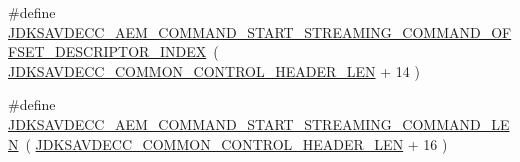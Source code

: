 \begin{DoxyCompactItemize}
\#define \hyperlink{group__command__start__streaming_ga9a6fbc00ff574d3d0a5d55567909aaf0}{J\+D\+K\+S\+A\+V\+D\+E\+C\+C\+\_\+\+A\+E\+M\+\_\+\+C\+O\+M\+M\+A\+N\+D\+\_\+\+S\+T\+A\+R\+T\+\_\+\+S\+T\+R\+E\+A\+M\+I\+N\+G\+\_\+\+C\+O\+M\+M\+A\+N\+D\+\_\+\+O\+F\+F\+S\+E\+T\+\_\+\+D\+E\+S\+C\+R\+I\+P\+T\+O\+R\+\_\+\+I\+N\+D\+EX}~( \hyperlink{group__jdksavdecc__avtp__common__control__header_gaae84052886fb1bb42f3bc5f85b741dff}{J\+D\+K\+S\+A\+V\+D\+E\+C\+C\+\_\+\+C\+O\+M\+M\+O\+N\+\_\+\+C\+O\+N\+T\+R\+O\+L\+\_\+\+H\+E\+A\+D\+E\+R\+\_\+\+L\+EN} + 14 )
\item 
\#define \hyperlink{group__command__start__streaming_ga64b3f37bb8a2701b0fa5255a96302231}{J\+D\+K\+S\+A\+V\+D\+E\+C\+C\+\_\+\+A\+E\+M\+\_\+\+C\+O\+M\+M\+A\+N\+D\+\_\+\+S\+T\+A\+R\+T\+\_\+\+S\+T\+R\+E\+A\+M\+I\+N\+G\+\_\+\+C\+O\+M\+M\+A\+N\+D\+\_\+\+L\+EN}~( \hyperlink{group__jdksavdecc__avtp__common__control__header_gaae84052886fb1bb42f3bc5f85b741dff}{J\+D\+K\+S\+A\+V\+D\+E\+C\+C\+\_\+\+C\+O\+M\+M\+O\+N\+\_\+\+C\+O\+N\+T\+R\+O\+L\+\_\+\+H\+E\+A\+D\+E\+R\+\_\+\+L\+EN} + 16 )
\end{DoxyCompactItemize}
